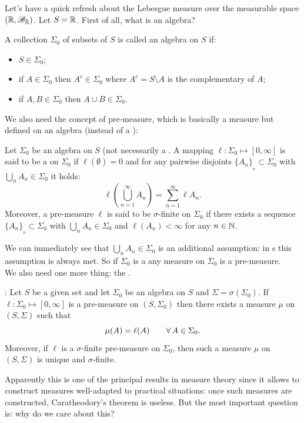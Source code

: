 \documentclass{report}
\begin{document}
\begin{revise}
Let's have a quick refresh about the Lebesgue measure over the measurable space $(\mathbb{R},\mathscr{B}_{\mathbb{R}})$. Let $S=\mathbb{R}$. First of all, what is an algebra?
\begin{definition}
	A collection $\Sigma_0$ of subsets of $S$ is called an algebra on $S$ if:
	\begin{itemize}
		\item $S\in\Sigma_0$;
		\item if $A\in\Sigma_0$ then $A^c\in\Sigma_0$ where $A^c=S\setminus A$ is the complementary of $A$;
		\item if $A,B\in\Sigma_0$ then $A\cup B\in\Sigma_0$.
	\end{itemize}
\end{definition}
We also need the concept of pre-measure, which is basically a measure but defined on an algebra (instead of a \sa{}):
\begin{definition}
	Let $\Sigma_0$ be an algebra on $S$ (not necessarily a \sa{}. A mapping $\ell:\Sigma_0\mapsto[0,\infty]$ is said to be a  on $\Sigma_0$ if $\ell(\emptyset)=0$ and for any pairwise disjoints $\{A_n\}_{_n}\subset\Sigma_0$ with $\bigcup_nA_n\in\Sigma_0$ it holds:
	\[\ell\left(\bigcup_{n=1}^\infty A_n\right)=\sum_{n=1}^{\infty}\ell{A_n}.  \] 
	Moreover, a pre-measure $\ell$ is said to be $\sigma$-finite on $\Sigma_0$ if there exists a sequence $\{A_n\}_{_n}\subset\Sigma_0$ with $\bigcup_nA_n\in\Sigma_0$ and $\ell(A_n)<\infty$ for any $n\in\mathbb{N}$.
\end{definition}
We can immediately see that $\bigcup_nA_n\in\Sigma_0$ is an additional assumption: in \sa s this assumption is always met. So if $\Sigma_0$ is a \sa{} any measure on $\Sigma_0$ is a pre-measure. \\
We also need one more thing: the .
\begin{theorem}
	: Let $S$ be a given set and let $\Sigma_0$ be an algebra on $S$ and $\Sigma=\sigma(\Sigma_0)$. If $\ell:\Sigma_0\mapsto[0,\infty]$ is a pre-measure on $(S,\Sigma_0)$ then there exists a measure $\mu$ on $(S,\Sigma)$ such that
	\[ \mu(A)=\ell(A)\qquad \forall\, A \in \Sigma_0. \]
	Moreover, if $\ell$ is a $\sigma$-finite pre-measure on $\Sigma_0$, then such a measure $\mu$ on $(S,\Sigma)$ is unique and $\sigma$-finite.
\end{theorem}Apparently this is one of the principal results in measure theory since it allows to construct measures well-adapted to practical situations: once such measures are constructed, Caratheodory's theorem is useless. But the most important question is: why do we care about this?

\end{revise}
\end{document}
